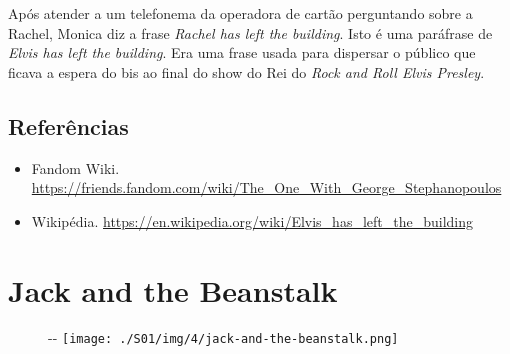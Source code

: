 Após atender a um telefonema da operadora de cartão perguntando sobre a
Rachel, Monica diz a frase \emph{Rachel has left the building}. Isto é
uma paráfrase de \emph{Elvis has left the building}. Era uma frase usada
para dispersar o público que ficava a espera do bis ao final do show do
Rei do \emph{Rock and Roll Elvis Presley}.

\hypertarget{referuxeancias-1}{%
\subsection{Referências}\label{referuxeancias-1}}

\begin{itemize}
\tightlist
\item
  \sloppy Fandom Wiki. \url{https://friends.fandom.com/wiki/The_One_With_George_Stephanopoulos}
\item
  \sloppy Wikipédia. \url{https://en.wikipedia.org/wiki/Elvis_has_left_the_building}
\end{itemize}

\hypertarget{jack-and-the-beanstalk}{%
\section{Jack and the Beanstalk}\label{jack-and-the-beanstalk}}

\begin{figure}[!ht]
  \begin{adjustwidth}{-\oddsidemargin-1in}{-\rightmargin}
    \centering
    \texttt{[image: ./S01/img/4/jack-and-the-beanstalk.png]}
  \end{adjustwidth}
\end{figure}

